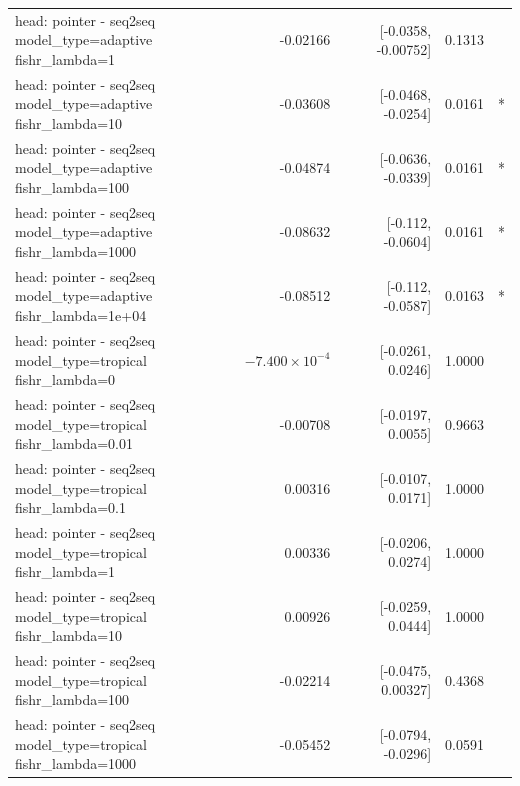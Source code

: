 \documentclass[10pt]{article}
\makeatletter
\newcommand{\stackcell}[1]{\begin{tabular}[t]{@{}l@{}}#1\end{tabular}}
\makeatother
\begin{document}
{\begin{longtable}{lrrrl}
\stackcell{head: pointer - seq2seq\\\footnotesize model\_type=adaptive fishr\_lambda=1 } & -0.02166 & [-0.0358, -0.00752] & 0.1313 & \\
\stackcell{head: pointer - seq2seq\\\footnotesize model\_type=adaptive fishr\_lambda=10 } & -0.03608 & [-0.0468, -0.0254] & 0.0161 & *\\
\stackcell{head: pointer - seq2seq\\\footnotesize model\_type=adaptive fishr\_lambda=100 } & -0.04874 & [-0.0636, -0.0339] & 0.0161 & *\\
\stackcell{head: pointer - seq2seq\\\footnotesize model\_type=adaptive fishr\_lambda=1000 } & -0.08632 & [-0.112, -0.0604] & 0.0161 & *\\
\stackcell{head: pointer - seq2seq\\\footnotesize model\_type=adaptive fishr\_lambda=1e+04 } & -0.08512 & [-0.112, -0.0587] & 0.0163 & *\\
\stackcell{head: pointer - seq2seq\\\footnotesize model\_type=tropical fishr\_lambda=0 } & $-7.400\times10^{-4}$ & [-0.0261, 0.0246] & 1.0000 & \\
\stackcell{head: pointer - seq2seq\\\footnotesize model\_type=tropical fishr\_lambda=0.01 } & -0.00708 & [-0.0197, 0.0055] & 0.9663 & \\
\stackcell{head: pointer - seq2seq\\\footnotesize model\_type=tropical fishr\_lambda=0.1 } & 0.00316 & [-0.0107, 0.0171] & 1.0000 & \\
\stackcell{head: pointer - seq2seq\\\footnotesize model\_type=tropical fishr\_lambda=1 } & 0.00336 & [-0.0206, 0.0274] & 1.0000 & \\
\stackcell{head: pointer - seq2seq\\\footnotesize model\_type=tropical fishr\_lambda=10 } & 0.00926 & [-0.0259, 0.0444] & 1.0000 & \\
\stackcell{head: pointer - seq2seq\\\footnotesize model\_type=tropical fishr\_lambda=100 } & -0.02214 & [-0.0475, 0.00327] & 0.4368 & \\
\stackcell{head: pointer - seq2seq\\\footnotesize model\_type=tropical fishr\_lambda=1000 } & -0.05452 & [-0.0794, -0.0296] & 0.0591 & \\

\end{longtable}}
\end{document}
